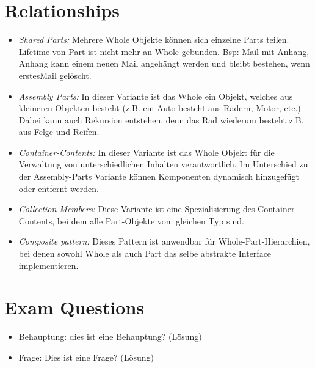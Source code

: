 \section{Relationships}
\begin{itemize}
	\item \textit{Shared Parts:} Mehrere Whole Objekte können sich einzelne Parts teilen. Lifetime von Part ist nicht mehr an Whole gebunden. Bsp: Mail mit Anhang, Anhang kann einem neuen Mail angehängt werden und bleibt bestehen, wenn erstesMail gelöscht.
	\item \textit{Assembly Parts:} In dieser Variante ist das Whole ein Objekt, welches aus kleineren Objekten besteht (z.B. ein Auto besteht aus Rädern, Motor, etc.) Dabei kann auch Rekursion entstehen, denn das Rad wiederum besteht z.B. aus Felge und Reifen.
	\item \textit{Container-Contents:} In dieser Variante ist das Whole Objekt für die Verwaltung von unterschiedlichen Inhalten verantwortlich. Im Unterschied zu der Assembly-Parts Variante können Komponenten dynamisch hinzugefügt oder entfernt werden.
	\item \textit{Collection-Members:} Diese Variante ist eine Spezialisierung des Container-Contents, bei dem alle Part-Objekte vom gleichen Typ sind.
	\item \textit{Composite pattern:} Dieses Pattern ist anwendbar für Whole-Part-Hierarchien, bei denen sowohl Whole als auch Part das selbe abstrakte Interface implementieren.
\end{itemize}

\section{Exam Questions}
\begin{itemize}
  	\item Behauptung: dies ist eine Behauptung? (Lösung)
    \item Frage: Dies ist eine Frage? (Lösung)
\end{itemize}
